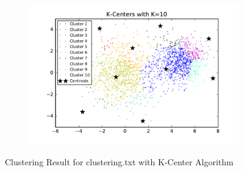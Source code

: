 \begin{description}
\begin{description}
\begin{figure}[!h]
\begin{subfigure}[b]{0.475\textwidth}
        \end{subfigure}
        \hfill
        \begin{subfigure}[b]{0.475\textwidth}   
            \centering 
            \includegraphics[width=\textwidth]{./figures/clustering_kCenter_10.pdf}
        \end{subfigure}
        
        \caption{Clustering Result for clustering.txt with K-Center Algorithm}
        \label{fig:kcenter_clustering}
\end{figure}


\end{description}
\end{description}
